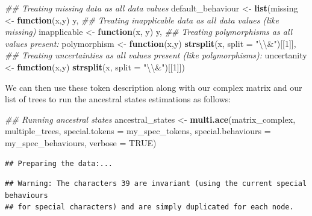 \documentclass[
]{book}
\newenvironment{Shaded}{\begin{snugshade}}{\end{snugshade}}
\newcommand{\CharTok}[1]{\textcolor[rgb]{0.31,0.60,0.02}{#1}}
\newcommand{\CommentTok}[1]{\textcolor[rgb]{0.56,0.35,0.01}{\textit{#1}}}
\newcommand{\ControlFlowTok}[1]{\textcolor[rgb]{0.13,0.29,0.53}{\textbf{#1}}}
\newcommand{\DataTypeTok}[1]{\textcolor[rgb]{0.13,0.29,0.53}{#1}}
\newcommand{\DecValTok}[1]{\textcolor[rgb]{0.00,0.00,0.81}{#1}}
\newcommand{\KeywordTok}[1]{\textcolor[rgb]{0.13,0.29,0.53}{\textbf{#1}}}
\newcommand{\NormalTok}[1]{#1}
\newcommand{\OtherTok}[1]{\textcolor[rgb]{0.56,0.35,0.01}{#1}}
\newcommand{\StringTok}[1]{\textcolor[rgb]{0.31,0.60,0.02}{#1}}
\begin{document}
\begin{Shaded}
\begin{Highlighting}[]
\CommentTok{\#\# Treating missing data as all data values}
\NormalTok{default\_behaviour \textless{}{-}}\StringTok{ }\KeywordTok{list}\NormalTok{(missing      \textless{}{-}}\StringTok{ }\ControlFlowTok{function}\NormalTok{(x,y) y,}
\CommentTok{\#\# Treating inapplicable data as all data values (like missing)    }
\NormalTok{                          inapplicable \textless{}{-}}\StringTok{ }\ControlFlowTok{function}\NormalTok{(x, y) y,}
\CommentTok{\#\# Treating polymorphisms as all values present:}
\NormalTok{                          polymorphism \textless{}{-}}\StringTok{ }\ControlFlowTok{function}\NormalTok{(x,y) }\KeywordTok{strsplit}\NormalTok{(x, }\DataTypeTok{split =} \StringTok{"}\CharTok{\textbackslash{}\textbackslash{}}\StringTok{\&"}\NormalTok{)[[}\DecValTok{1}\NormalTok{]],}
\CommentTok{\#\# Treating uncertainties as all values present (like polymorphisms):}
\NormalTok{                          uncertanity  \textless{}{-}}\StringTok{ }\ControlFlowTok{function}\NormalTok{(x,y) }\KeywordTok{strsplit}\NormalTok{(x, }\DataTypeTok{split =} \StringTok{"}\CharTok{\textbackslash{}\textbackslash{}}\StringTok{\&"}\NormalTok{)[[}\DecValTok{1}\NormalTok{]])}
\end{Highlighting}
\end{Shaded}

We can then use these token description along with our complex matrix and our list of trees to run the ancestral states estimations as follows:

\begin{Shaded}
\begin{Highlighting}[]
\CommentTok{\#\# Running ancestral states}
\NormalTok{ancestral\_states \textless{}{-}}\StringTok{ }\KeywordTok{multi.ace}\NormalTok{(matrix\_complex, multiple\_trees,}
                              \DataTypeTok{special.tokens =}\NormalTok{ my\_spec\_tokens,}
                              \DataTypeTok{special.behaviours =}\NormalTok{ my\_spec\_behaviours,}
                              \DataTypeTok{verbose =} \OtherTok{TRUE}\NormalTok{)}
\end{Highlighting}
\end{Shaded}

\begin{verbatim}
## Preparing the data:...
\end{verbatim}

\begin{verbatim}
## Warning: The characters 39 are invariant (using the current special behaviours
## for special characters) and are simply duplicated for each node.
\end{verbatim}
\end{document}
